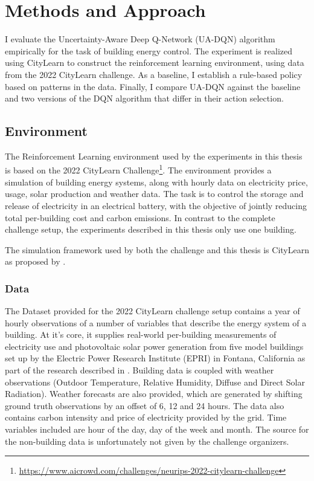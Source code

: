 \chapter{Methods and Approach}
    \label{approach}

I evaluate the Uncertainty-Aware Deep Q-Network (UA-DQN) algorithm empirically for the task of building energy control.
The experiment is realized using CityLearn to construct the reinforcement learning environment, using data from the 2022 CityLearn challenge.
As a baseline, I establish a rule-based policy based on patterns in the data.
Finally, I compare UA-DQN against the baseline and two versions of the DQN algorithm that differ in their action selection.


\section{Environment}
The Reinforcement Learning environment used by the experiments in this thesis is based on the 2022 CityLearn Challenge\footnote{\url{https://www.aicrowd.com/challenges/neurips-2022-citylearn-challenge}}.
The environment provides a simulation of building energy systems, along with hourly data on electricity price, usage, solar production and weather data.
The task is to control the storage and release of electricity in an electrical battery, with the objective of jointly reducing total per-building cost and carbon emissions.
In contrast to the complete challenge setup, the experiments described in this thesis only use one building.

The simulation framework used by both the challenge and this thesis is CityLearn as proposed by \citep{vazquez-canteli2019CityLearnV1OpenAI}.

\subsection{Data}
The Dataset provided for the 2022 CityLearn challenge setup contains a year of hourly observations of a number of variables that describe the energy system of a building.
At it's core, it supplies real-world per-building measurements of electricity use and photovoltaic solar power generation from five model buildings set up by the Electric Power Research Institute (EPRI) in Fontana, California as part of the research described in \cite{narayanamurthy2016GridIntegrationZero}.
Building data is coupled with weather observations (Outdoor Temperature, Relative Humidity, Diffuse and Direct Solar Radiation).
Weather forecasts are also provided, which are generated by shifting ground truth observations by an offset of 6, 12 and 24 hours.
The data also contains carbon intensity and price of electricity provided by the grid.
Time variables included are hour of the day, day of the week and month.
The source for the non-building data is unfortunately not given by the challenge organizers.


